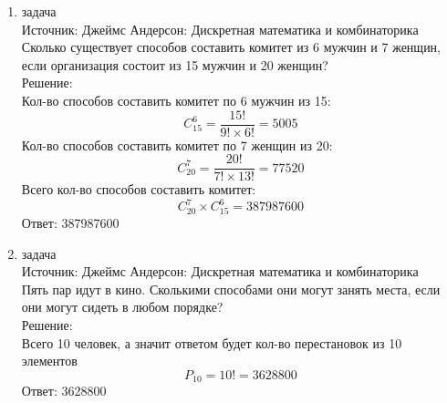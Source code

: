 \documentclass[a4paper,14pt]{extreport} %
\begin{document}
\begin{center}
\begin{enumerate}
						 
						  \item {\large задача  }\\
						 Источник: Джеймс Андерсон: Дискретная математика и комбинаторика\\
						 \vspace{15pt}
						 Сколько существует способов составить комитет из 6 мужчин и 7 женщин,
						 если организация состоит из 15 мужчин и 20 женщин?
						 \\
						 \vspace{15pt}
						 Решение:\\
						 Кол-во способов составить комитет по 6 мужчин из 15: \begin{equation}
						 	C_{15}^6 = \frac{15!}{9!\times6!} = 5005
						 \end{equation}
						 Кол-во способов составить комитет по 7 женщин из 20: \begin{equation}C_{20}^7 = \frac{20!}{7!\times13!} = 77520\end{equation}
						 Всего кол-во способов составить комитет: \begin{equation}C_{20}^7 \times C_{15}^6 = 387987600\end{equation}
						 Ответ: 387987600
						 
						 
						 
						 
						 
						  \item {\large задача  }\\
						 Источник: Джеймс Андерсон: Дискретная математика и комбинаторика\\
						 \vspace{15pt}
						 Пять пар идут в кино. Сколькими способами они могут занять места, если они могут сидеть в любом порядке?
						 \\
						 \vspace{15pt}
						 Решение:\\
						 Всего 10 человек, а значит ответом будет кол-во перестановок из 10 элементов
						 \begin{equation}P_10 = 10! = 3628800\end{equation}
						 Ответ: 3628800
						 

\end{enumerate}
\end{center}
\end{document}
